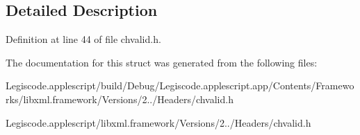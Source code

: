\subsection{Detailed Description}


Definition at line 44 of file chvalid.\-h.



The documentation for this struct was generated from the following files\-:\begin{DoxyCompactItemize}
\item 
Legiscode.\-applescript/build/\-Debug/\-Legiscode.\-applescript.\-app/\-Contents/\-Frameworks/libxml.\-framework/\-Versions/2../\-Headers/chvalid.\-h\item 
Legiscode.\-applescript/libxml.\-framework/\-Versions/2../\-Headers/chvalid.\-h\end{DoxyCompactItemize}
